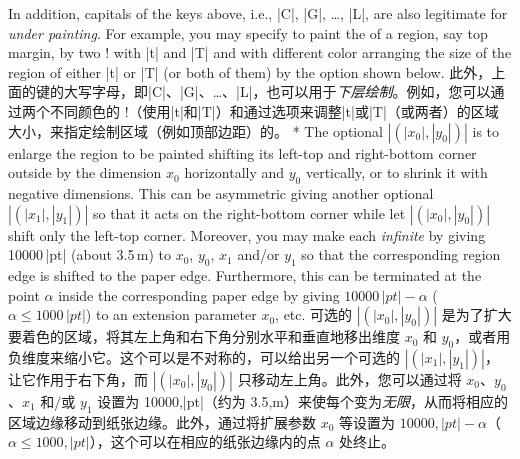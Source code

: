 \begin{description}
\begin{description}
\end{description}
\begin{paracol}{2}
In addition, capitals of the keys above, i.e., |C|, |G|, \ldots, |L|, are
also legitimate for {\em under painting}.  For example, you may specify to
paint the \bground{} of a region, say top margin, by two
\!\backgroundcolor! with |t| and |T| and with different color arranging the
size of the region of either |t| or |T| (or both of them) by the
\emph{\bgext} option shown below.
\switchcolumn
此外，上面的键的大写字母，即|C|、|G|、\ldots、|L|，也可以用于{\em 下层绘制}。例如，您可以通过两个不同颜色的 \!\backgroundcolor!（使用|t|和|T|）和通过\emph{\bgext}选项来调整|t|或|T|（或两者）的区域大小，来指定绘制区域（例如顶部边距）的\bground{}。
\switchcolumn[0]*
The optional $|(|x_0|,|y_0|)|$ is to enlarge the region to be painted
shifting its left-top and right-bottom corner outside by
the dimension $x_0$ horizontally and $y_0$ vertically, or to shrink it
with negative dimensions.  This {\em\Uidx\bgext} can be asymmetric giving
another optional $|(|x_1|,|y_1|)|$ so that it acts on the right-bottom
corner while let $|(|x_0|,|y_0|)|$ shift only the left-top corner.
Moreover, you may make each \bgext{} {\em infinite} by giving 10000\,|pt|
(about 3.5\,m) to $x_0$, $y_0$, $x_1$ and/or $y_1$ so that the
corresponding region edge is shifted to the paper edge.  Furthermore, this
{\em\Uidx\bginfext{}} can be terminated at the point $\alpha$ inside the
corresponding paper edge by giving $10000\,|pt|-\alpha$
($\alpha\leq1000\,|pt|$) to an extension parameter $x_0$, etc.
\switchcolumn
可选的 $|(|x_0|,|y_0|)|$ 是为了扩大要着色的区域，将其左上角和右下角分别水平和垂直地移出维度 $x_0$ 和 $y_0$，或者用负维度来缩小它。这个{\em\Uidx\bgext}可以是不对称的，可以给出另一个可选的 $|(|x_1|,|y_1|)|$，让它作用于右下角，而 $|(|x_0|,|y_0|)|$ 只移动左上角。此外，您可以通过将 $x_0$、$y_0$、$x_1$ 和/或 $y_1$ 设置为 10000,|pt|（约为 3.5,m）来使每个\bgext{}变为{\em 无限}，从而将相应的区域边缘移动到纸张边缘。此外，通过将扩展参数 $x_0$ 等设置为 $10000,|pt|-\alpha$（$\alpha\leq1000,|pt|$），这个{\em\Uidx\bginfext{}}可以在相应的纸张边缘内的点 $\alpha$ 处终止。
\end{paracol}



\end{description}
